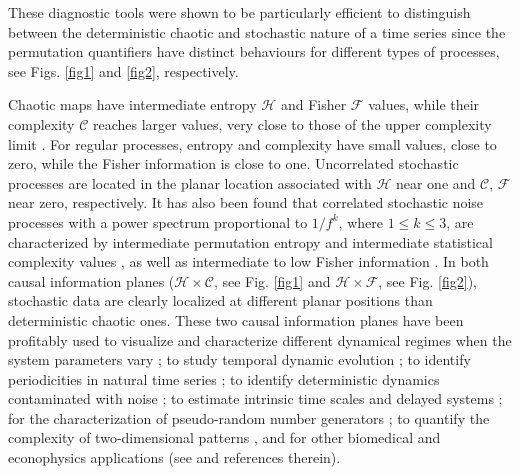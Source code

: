 These diagnostic tools were shown to be particularly efficient to distinguish between the deterministic chaotic and stochastic nature of a time series since the permutation quantifiers have distinct behaviours for different types of processes, see Figs. \ref{fig1} and \ref{fig2}, respectively. 

Chaotic maps have intermediate entropy ${\mathcal H}$ and Fisher ${\mathcal F}$ values, while their complexity 
${\mathcal C}$ reaches larger values, very close to those of the upper complexity limit \cite{Rosso2007,Olivares2012B}. For regular processes, entropy and complexity have small values, close to zero, while the Fisher information is close to one. 
Uncorrelated stochastic processes are located in the planar location associated with
${\mathcal H}$ near one and ${\mathcal C}$, ${\mathcal F}$ near zero, respectively.
It has also been found that correlated stochastic noise processes with a power spectrum proportional to $1/f^k$, where $1 \leq k \leq 3$, are characterized by intermediate permutation entropy and intermediate statistical complexity values \cite{Rosso2007}, as well as intermediate to low Fisher information \cite{Olivares2012B}.
In both causal information planes (${\mathcal H} \times {\mathcal C}$, see Fig. \ref{fig1} and  ${\mathcal H} \times {\mathcal F}$, see Fig. 
\ref{fig2}), stochastic data are clearly localized at different planar positions than deterministic chaotic ones. 
These two causal information planes have been profitably used to visualize and characterize different dynamical regimes when the system parameters vary  
\cite{Olivares2012A,Olivares2012B,Rosso2010,Kowalski2011,DeMicco2012,Lange2013,Serinaldi2014,Montani2014A,Montani2014B,Montani2015A,
	Montani2015B,Aquino2015}; 
to study temporal dynamic evolution 
\cite{Kowalski2007,Bariviera2015A,Bariviera2015B};
to identify periodicities in natural time series 
\cite{Bandt2005};
to identify deterministic dynamics contaminated with noise 
\cite{Rosso2012A,Rosso2012B};
to estimate intrinsic time scales and delayed systems 
\cite{Zunino2010B,Soriano2011,Zunino2012};
for the characterization of pseudo-random number generators
\cite{Demico2008,Demico2012};
to quantify the complexity of two-dimensional patterns
\cite{Ribeiro2012}, and 
for other biomedical and econophysics applications (see \cite{Zanin2012} and references therein).

